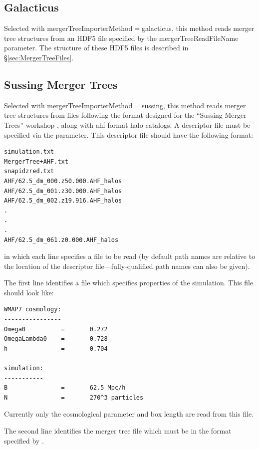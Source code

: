 \subsection{Galacticus}\label{phys:mergerTreeImporter:mergerTreeImporterGalacticus}

Selected with {\normalfont \ttfamily mergerTreeImporterMethod}$=${\normalfont \ttfamily galacticus}, this method reads merger tree structures from an HDF5 file specified by the {\normalfont \ttfamily mergerTreeReadFileName} parameter. The structure of these HDF5 files is described in \S\ref{sec:MergerTreeFiles}.

\subsection{Sussing Merger Trees}\label{phys:mergerTreeImporter:mergerTreeImporterSussing}

Selected with {\normalfont \ttfamily mergerTreeImporterMethod}$=${\normalfont \ttfamily sussing}, this method reads merger tree structures from files following the format designed for the ``Sussing Merger Trees'' workshop \citep{srisawat_sussing_2013}, along with \gls{ahf} format halo catalogs. A descriptor file must be specified via the {\normalfont \ttfamily [mergerTreeReadFileName]} parameter. This descriptor file should have the following format:
\begin{verbatim}
simulation.txt
MergerTree+AHF.txt
snapidzred.txt
AHF/62.5_dm_000.z50.000.AHF_halos
AHF/62.5_dm_001.z30.000.AHF_halos
AHF/62.5_dm_002.z19.916.AHF_halos
.
.
.
AHF/62.5_dm_061.z0.000.AHF_halos
\end{verbatim}
in which each line specifies a file to be read (by default path names are relative to the location of the descriptor file---fully-qualified path names can also be given).

The first line identifies a file which specifies properties of the simulation. This file should look like:
\begin{verbatim}
WMAP7 cosmology:
----------------
Omega0          =       0.272
OmegaLambda0    =       0.728
h               =       0.704

simulation:
-----------
B               =       62.5 Mpc/h
N               =       270^3 particles
\end{verbatim}
Currently only the cosmological parameter and box length are read from this file.

The second line identifies the merger tree file which must be in the format specified by \cite{srisawat_sussing_2013}.

